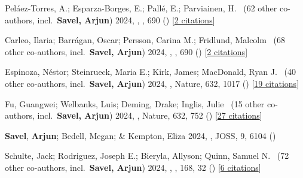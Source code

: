 \item[{\color{numcolor}\scriptsize39}] Pel{\'a}ez-Torres, A.; Esparza-Borges, E.; Pall{\'e}, E.; Parviainen, H. \etal\ ({62} other co-authors, incl.\ \textbf{Savel, Arjun}) 2024, , \aanda, {690} () [\href{https://ui.adsabs.harvard.edu/abs/2024A&A...690A..62P}{2 citations}]

\item[{\color{numcolor}\scriptsize38}] Carleo, Ilaria; Barr{\'a}gan, Oscar; Persson, Carina M.; Fridlund, Malcolm \etal\ ({68} other co-authors, incl.\ \textbf{Savel, Arjun}) 2024, , \aanda, {690} () [\href{https://ui.adsabs.harvard.edu/abs/2024A&A...690A..18C}{2 citations}]

\item[{\color{numcolor}\scriptsize37}] Espinoza, N{\'e}stor; Steinrueck, Maria E.; Kirk, James; MacDonald, Ryan J. \etal\ ({40} other co-authors, incl.\ \textbf{Savel, Arjun}) 2024, , Nature, {632}, 1017 () [\href{https://ui.adsabs.harvard.edu/abs/2024Natur.632.1017E}{19 citations}]

\item[{\color{numcolor}\scriptsize36}] Fu, Guangwei; Welbanks, Luis; Deming, Drake; Inglis, Julie \etal\ ({15} other co-authors, incl.\ \textbf{Savel, Arjun}) 2024, , Nature, {632}, 752 () [\href{https://ui.adsabs.harvard.edu/abs/2024Natur.632..752F}{27 citations}]

\item[{\color{numcolor}\scriptsize35}] \textbf{Savel}, \textbf{Arjun}; Bedell, Megan; \& Kempton, Eliza 2024, , JOSS, {9}, 6104 ()

\item[{\color{numcolor}\scriptsize34}] Schulte, Jack; Rodriguez, Joseph E.; Bieryla, Allyson; Quinn, Samuel N. \etal\ ({72} other co-authors, incl.\ \textbf{Savel, Arjun}) 2024, , \aj, {168}, 32 () [\href{https://ui.adsabs.harvard.edu/abs/2024AJ....168...32S}{6 citations}]

